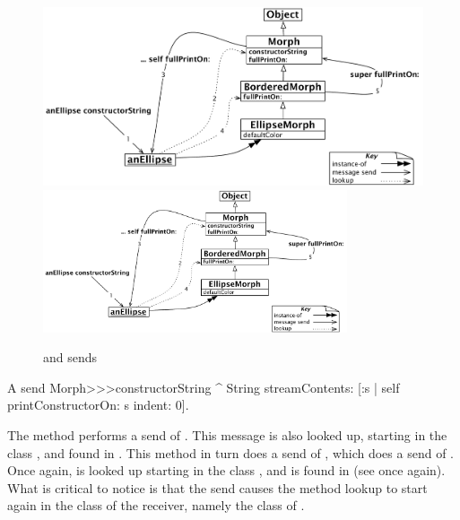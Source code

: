 \documentclass[a4paper,10pt,twoside]{book}
\begin{document}
\begin{figure}[htb]
\begin{center}
\ifluluelse
	{\includegraphics[width=\textwidth]{constructorStringLookup}}
	{\includegraphics[width=0.8\textwidth]{constructorStringLookup}}
\caption{\self and \super sends}
\end{center}
\end{figure}

\begin{method}[constructorString]{A \self send}
Morph>>>constructorString
	^ String streamContents: [:s | self printConstructorOn: s indent: 0].
\end{method}
The method  performs a \self send of .
This message is also looked up, starting in the class , and found in .
This method in turn does a \self send of , which does a \self send of .
Once again,  is looked up starting in the class , and  is found in  (see  once again).
What is critical to notice is that the \self send causes the method lookup to start again in the class of the receiver, namely the class of .

\end{document}
